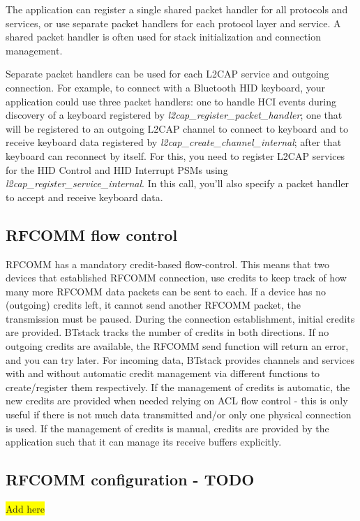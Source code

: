 \documentclass[a4paper,titlepage,oneside,12pt]{amsart} %
\newcommand{\todo}[1]{\colorbox{yellow}{#1}}
\begin{document}
The application can register a single shared packet handler for all protocols and services, or use separate packet handlers for each protocol layer and service. A shared packet handler is often used for stack initialization and connection management.

Separate packet handlers can be used for each L2CAP service and outgoing connection. For example, to connect with a Bluetooth HID keyboard, your application could use three packet handlers: one to handle HCI events during discovery of a keyboard registered by \emph{l2cap\_register\_packet\_handler}; one that will be registered to an outgoing L2CAP channel to connect to keyboard and to receive keyboard data registered by \emph{l2cap\_create\_channel\_internal}; after that keyboard can reconnect by itself. For this, you need to register L2CAP services for the HID Control and HID Interrupt PSMs using \emph{l2cap\_register\_service\_internal}. In this call, you'll also specify a packet handler to accept and receive keyboard data. 

\subsection{RFCOMM flow control}
\label{section:flowcontrol}
RFCOMM has a mandatory credit-based flow-control. This means that two devices that established RFCOMM connection, use credits to keep track of how many more RFCOMM data packets can be sent to each. If a device has no (outgoing) credits left, it cannot send another RFCOMM packet, the transmission must be paused. During the connection establishment, initial credits are provided. BTstack tracks the number of credits in both directions. If no outgoing credits are available, the RFCOMM send function will return an error, and you can try later. For incoming data, BTstack provides channels and services with and without automatic credit management via different functions to create/register them respectively. If the management of credits is automatic, the new credits are provided when needed relying on ACL flow control - this is only useful if there is not much data transmitted and/or only one physical connection is used. If the management of credits is manual, credits are provided by the application such that it can manage its receive buffers explicitly. 

\subsection{RFCOMM configuration - TODO}
\todo{Add here}
\end{document}
